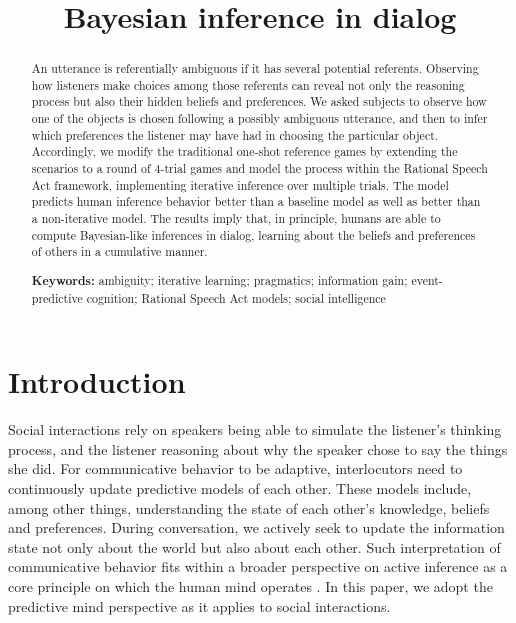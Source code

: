 \documentclass[10pt,a4paper]{article}
\title{Bayesian inference in dialog}
\begin{document}
\maketitle

\begin{abstract}
	
An utterance is referentially ambiguous if it has several potential referents.
Observing how listeners make choices among those referents can reveal not only the reasoning process but also their hidden beliefs and preferences.
We asked subjects to observe how one of the objects is chosen following a possibly ambiguous utterance, and then to infer which preferences the listener may have had in choosing the particular object.
Accordingly, we modify the traditional one-shot reference games by extending the scenarios to a round of 4-trial games and model the process within the Rational Speech Act framework, implementing iterative inference over multiple trials.
The model predicts human inference behavior better than a baseline model as well as better than a non-iterative model. 
The results imply that, in principle, humans are able to compute Bayesian-like inferences in dialog, learning about the beliefs and preferences of others in a cumulative manner.
                                                     

\textbf{Keywords:} 
ambiguity; iterative learning; pragmatics; information gain; event-predictive cognition; Rational Speech Act models; social intelligence
\end{abstract}





\section{Introduction}

Social interactions rely on speakers being able to simulate the listener's thinking process, and the listener reasoning about why the speaker chose to say the things she did. For communicative behavior to be adaptive, interlocutors need to continuously update predictive models of each other. These models include, among other things, understanding the state of each other's knowledge, beliefs and preferences. During conversation, we actively seek to update the information state not only about the world but also about each other. Such interpretation of communicative behavior fits within a broader perspective on active inference as a core principle on which the human mind operates \cite{Friston:2015, Hohwy:2013, Clark:2016}. In this paper, we adopt the predictive mind perspective as it applies to social interactions.
\end{document}
